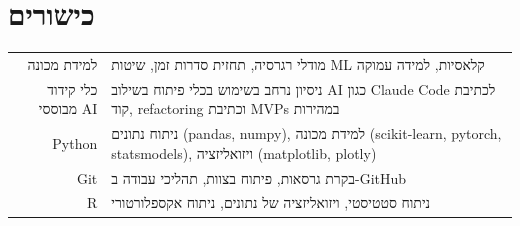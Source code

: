 \documentclass[a4paper,12pt]{article}
\begin{document}
\section{כישורים}
\begin{tabularx}{\linewidth}{@{}r X@{}}
למידת מכונה & מודלי רגרסיה, תחזית סדרות זמן, שיטות \textenglish{ML} קלאסיות, למידה עמוקה \\
כלי קידוד מבוססי \textenglish{AI} & ניסיון נרחב בשימוש בכלי פיתוח בשילוב \textenglish{AI} כגון \textenglish{Claude Code} לכתיבת קוד, \textenglish{refactoring} וכתיבת \textenglish{MVPs} במהירות \\
\textenglish{Python} & ניתוח נתונים \textenglish{(pandas, numpy)}, למידת מכונה \textenglish{(scikit-learn, pytorch, statsmodels)}, ויזואליזציה \textenglish{(matplotlib, plotly)} \\
\textenglish{Git} & בקרת גרסאות, פיתוח בצוות, תהליכי עבודה ב-\textenglish{GitHub} \\
\textenglish{R} & ניתוח סטטיסטי, ויזואליזציה של נתונים, ניתוח אקספלורטורי \\
\end{tabularx}

\vfill
{}
\end{document}
